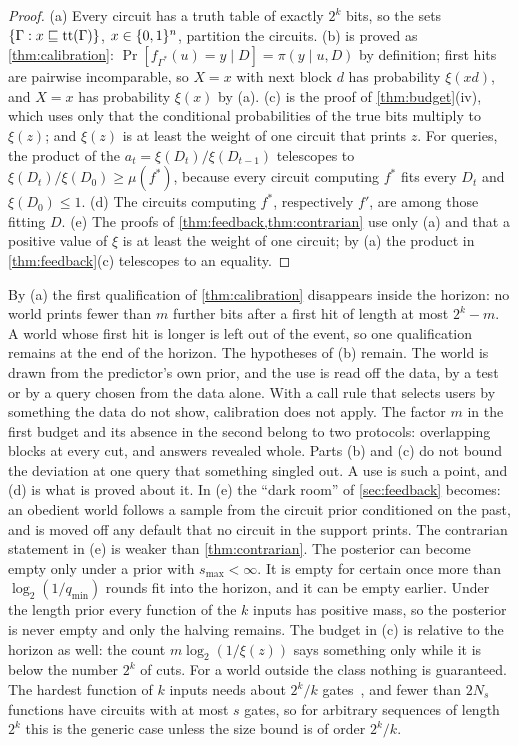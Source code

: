 \begin{proof}
(a) Every circuit has a truth table of exactly $2^k$ bits, so the sets $\{\Gamma:x\sqsubseteq\mathrm{tt}(\Gamma)\}$,
$x\in\{0,1\}^n$, partition the circuits. (b) is proved as \cref{thm:calibration}:
$\Pr[f_{\Gamma^*}(u)=y\mid D]=\pi(y\mid u,D)$ by definition; first hits are pairwise incomparable, so $X=x$
with next block $d$ has probability $\xi(xd)$, and $X=x$ has probability $\xi(x)$ by (a). (c) is the proof of
\cref{thm:budget}(iv), which uses only that the conditional probabilities of the true bits multiply to
$\xi(z)$; and $\xi(z)$ is at least the weight of one circuit that prints $z$. For queries, the product of the
$a_t=\xi(D_t)/\xi(D_{t-1})$ telescopes to $\xi(D_t)/\xi(D_0)\ge\mu(f^*)$, because every circuit computing
$f^*$ fits every $D_t$ and $\xi(D_0)\le1$. (d) The circuits computing $f^*$, respectively $f'$, are among
those fitting $D$. (e) The proofs of \cref{thm:feedback,thm:contrarian} use only (a) and that a positive value
of $\xi$ is at least the weight of one circuit; by (a) the product in \cref{thm:feedback}(c) telescopes to an
equality.
\end{proof}

By (a) the first qualification of \cref{thm:calibration} disappears inside the horizon: no world prints fewer
than $m$ further bits after a first hit of length at most $2^k-m$. A world whose first hit is longer is left
out of the event, so one qualification remains at the end of the horizon. The hypotheses of (b) remain. The
world is drawn from the predictor's own prior, and the use is read off the data, by a test or by a query
chosen from the data alone. With a call rule that selects users by something the data do not show, calibration
does not apply. The factor $m$ in the first budget and its absence in the second belong to two protocols:
overlapping blocks at every cut, and answers revealed whole. Parts (b) and (c) do not bound the deviation at
one query that something singled out. A use is such a point, and (d) is what is proved about it. In (e) the
``dark room'' of \cref{sec:feedback} becomes: an obedient world follows a sample from the circuit prior
conditioned on the past, and is moved off any default that no circuit in the support prints. The contrarian
statement in (e) is weaker than \cref{thm:contrarian}. The posterior can become empty only under a prior with
$s_{\max}<\infty$. It is empty for certain once more than $\log_2(1/q_{\min})$ rounds fit into the horizon,
and it can be empty earlier. Under the length prior every function of
the $k$ inputs has positive mass, so the posterior is never empty and only the halving remains. The budget in
(c) is relative to the horizon as well: the count $m\log_2(1/\xi(z))$ says something only while it is below
the number $2^k$ of cuts. For a world outside the class nothing is guaranteed. The hardest function of $k$
inputs needs about $2^k/k$ gates~\cite{frandsen05}, and fewer than $2N_s$ functions have circuits with at most
$s$ gates, so for arbitrary sequences of length $2^k$ this is the generic case unless the size bound is
of order $2^k/k$.

